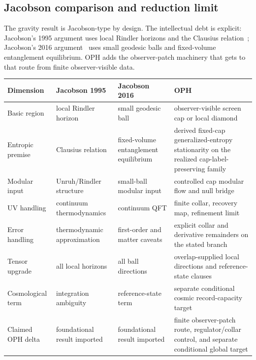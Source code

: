 \documentclass[11pt]{article}
\begin{document}
\subsection*{Jacobson comparison and reduction limit}

The gravity result is Jacobson-type by design. The intellectual debt is explicit: Jacobson's 1995
argument uses local Rindler horizons and the Clausius relation~\cite{jacobson95}; Jacobson's 2016 argument~\cite{jacobson16} uses
small geodesic balls and fixed-volume entanglement equilibrium. OPH adds the observer-patch
machinery that gets to that route from finite observer-visible data.

\begingroup
\footnotesize
\begin{longtable}{@{}>{\raggedright\arraybackslash}p{}>{\raggedright\arraybackslash}p{}>{\raggedright\arraybackslash}p{}>{\raggedright\arraybackslash}p{}@{}}
\toprule
Dimension & Jacobson 1995 & Jacobson 2016 & OPH \\
\midrule
\endhead
\bottomrule
\endfoot
Basic region & local Rindler horizon & small geodesic ball & observer-visible screen cap or local diamond \\
Entropic premise & Clausius relation & fixed-volume entanglement equilibrium & derived fixed-cap generalized-entropy stationarity on the realized cap-label-preserving family \\
Modular input & Unruh/Rindler structure & small-ball modular input & controlled cap modular flow and null bridge \\
UV handling & continuum thermodynamics & continuum QFT & finite collar, recovery map, refinement limit \\
Error handling & thermodynamic approximation & first-order and matter caveats & explicit collar and derivative remainders on the stated branch \\
Tensor upgrade & all local horizons & all ball directions & overlap-supplied local directions and reference-state clauses \\
Cosmological term & integration ambiguity & reference-state term & separate conditional cosmic record-capacity target \\
Claimed OPH delta & foundational result imported & foundational result imported & finite observer-patch route, regulator/collar control, and separate conditional global target \\
\end{longtable}
\endgroup
\end{document}
